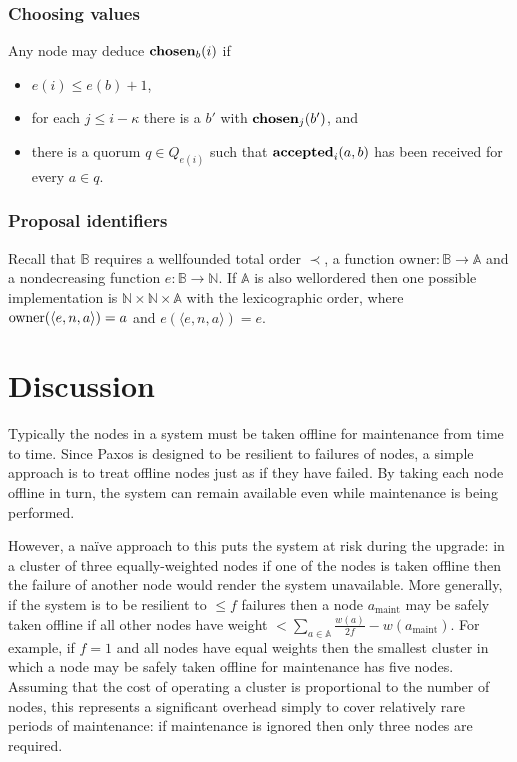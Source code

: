 \documentclass[journal]{IEEEtran}
\begin{document}
\subsubsection{Choosing values} Any node may deduce $\mathbf{chosen}_{b}(i)$ if
\begin{itemize} \item $e(i) \le e(b) + 1$, \item for each $j \le i - \kappa$
there is a $b'$ with $\mathbf{chosen}_{j}(b')$, and \item there is a quorum $q \in
Q_{e(i)}$ such that $\mathbf{accepted}_{i}(a,b)$ has been received for every $a \in q$.
\end{itemize}

\subsubsection{Proposal identifiers} Recall that $\mathbb B$ requires a
wellfounded total order $\prec$, a function $\mathrm{owner} : \mathbb B \to
\mathbb A$ and a nondecreasing function $e : \mathbb B \to \mathbb N$. If
$\mathbb A$ is also wellordered then one possible implementation is $\mathbb N
\times \mathbb N \times \mathbb A$ with the lexicographic order, where
$\mathrm{owner}(\langle e, n, a \rangle) = a$ and $e(\langle e, n, a\rangle) = e$.

\section{Discussion}\label{discussion}

Typically the nodes in a system must be taken offline for maintenance from time
to time. Since Paxos is designed to be resilient to failures of nodes, a simple
approach is to treat offline nodes just as if they have failed. By taking each
node offline in turn, the system can remain available even while maintenance is
being performed.

However, a na\"ive approach to this puts the system at risk during the upgrade:
in a cluster of three equally-weighted nodes if one of the nodes is taken
offline then the failure of another node would render the system unavailable.
More generally, if the system is to be resilient to $\le f$ failures then a
node $a_{\textrm{maint}}$ may be safely taken offline if all other nodes have
weight $< \sum_{a \in \mathbb A} \frac{w(a)}{2f} - w(a_{\textrm{maint}})$. For
example, if $f = 1$ and all nodes have equal weights then the smallest cluster
in which a node may be safely taken offline for maintenance has five nodes.
Assuming that the cost of operating a cluster is proportional to the number of
nodes, this represents a significant overhead simply to cover relatively rare
periods of maintenance: if maintenance is ignored then only three nodes are
required.
\end{document}
